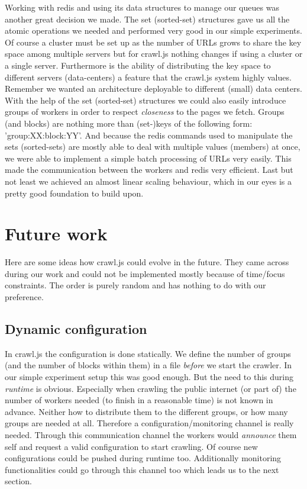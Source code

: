 Working with redis and using its data structures to manage our queues was another great decision we made. The set (sorted-set) structures gave us all the atomic operations we needed and performed very good in our simple experiments. Of course a cluster must be set up as the number of URLs grows to share the key space among multiple servers but for crawl.js nothing changes if using a cluster or a single server. Furthermore is the ability of distributing the key space to different servers (data-centers) a feature that the crawl.js system highly values. Remember we wanted an architecture deployable to different (small) data centers.
\newline
With the help of the set (sorted-set) structures we could also easily introduce groups of workers in order to respect \emph{closeness} to the pages we fetch. Groups (and blocks) are nothing more than (set-)keys of the following form: 'group:XX:block:YY'. And because the redis commands used to manipulate the sets (sorted-sets) are mostly able to deal with multiple values (members) at once, we were able to implement a simple batch processing of URLs very easily. This made the communication between the workers and redis very efficient.
\newline
Last but not least we achieved an almost linear scaling behaviour, which in our eyes is a pretty good foundation to build upon.

\section{Future work}
Here are some ideas how crawl.js could evolve in the future. They came across during our work and could not be implemented mostly because of time/focus constraints. The order is purely random and has nothing to do with our preference.

\subsection{Dynamic configuration}
In crawl.js the configuration is done statically. We define the number of groups (and the number of blocks within them) in a file \emph{before} we start the crawler. In our simple experiment setup this was good enough. But the need to this during \emph{runtime} is obvious. Especially when crawling the public internet (or part of) the number of workers needed (to finish in a reasonable time) is not known in advance. Neither how to distribute them to the different groups, or how many groups are needed at all. Therefore a configuration/monitoring channel is really needed. Through this communication channel the workers would \emph{announce} them self and request a valid configuration to start crawling. Of course new configurations could be pushed during runtime too. Additionally monitoring functionalities could go through this channel too which leads us to the next section. 

